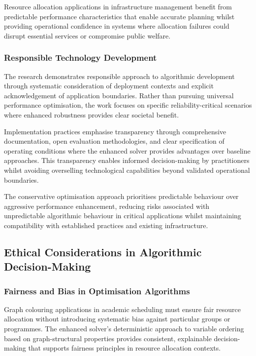 Resource allocation applications in infrastructure management benefit from predictable performance characteristics that enable accurate planning whilst providing operational confidence in systems where allocation failures could disrupt essential services or compromise public welfare.

\subsubsection{Responsible Technology Development}

The research demonstrates responsible approach to algorithmic development through systematic consideration of deployment contexts and explicit acknowledgement of application boundaries. Rather than pursuing universal performance optimisation, the work focuses on specific reliability-critical scenarios where enhanced robustness provides clear societal benefit.

Implementation practices emphasise transparency through comprehensive documentation, open evaluation methodologies, and clear specification of operating conditions where the enhanced solver provides advantages over baseline approaches. This transparency enables informed decision-making by practitioners whilst avoiding overselling technological capabilities beyond validated operational boundaries.

The conservative optimisation approach prioritises predictable behaviour over aggressive performance enhancement, reducing risks associated with unpredictable algorithmic behaviour in critical applications whilst maintaining compatibility with established practices and existing infrastructure.

\subsection{Ethical Considerations in Algorithmic Decision-Making}

\subsubsection{Fairness and Bias in Optimisation Algorithms}

Graph colouring applications in academic scheduling must ensure fair resource allocation without introducing systematic bias against particular groups or programmes. The enhanced solver's deterministic approach to variable ordering based on graph-structural properties provides consistent, explainable decision-making that supports fairness principles in resource allocation contexts.

